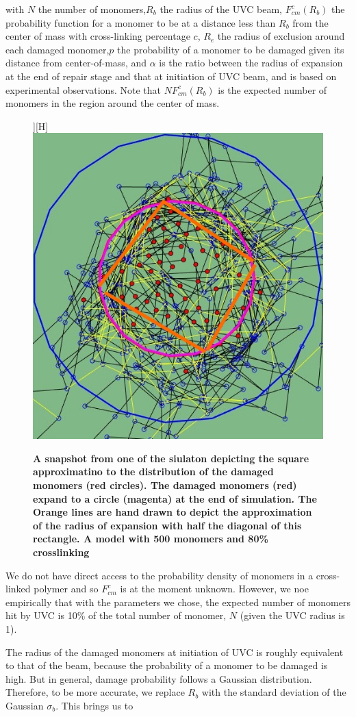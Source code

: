 \documentclass[12pt]{report}
\begin{document}
   with $N$ the number of monomers,$R_b$ the radius of the UVC beam, $F_{cm}^c(R_b)$ the probability function for a monomer to be at a distance less than $R_b$ from the center of mass with cross-linking percentage $c$, $R_e$ the radius of exclusion around each damaged monomer,$p$ the probability of a monomer to be damaged given its distance from center-of-mass, and $\alpha$ is the ratio between the radius of expansion at the end of repair stage and that at initiation of UVC beam, and is based on experimental observations. Note that $NF_{cm}^c(R_b)$ is the expected number of monomers in the region around the center of mass. 
   
	\begin{figure}][H]
	\centering
	\includegraphics[width=0.4\linewidth]{Images/ExludeAroundDamagedMonomers/BreakDamagedCrosslinks/testExpansion/snapshotForExampleOfExpansionEstimation}
	\caption{\tiny{\textbf{A snapshot from one of the siulaton depicting the square approximatino to the distribution of the damaged monomers (red circles). The damaged monomers (red) expand to a circle (magenta) at the end of simulation. The Orange lines are hand drawn to depict the approximation of the radius of expansion with half the diagonal of this rectangle. A model with 500 monomers and 80\% crosslinking}}}
	\label{fig:snapshotForExampleOfExpansionEstimation}
	\end{figure}
   We do not have direct access to the probability density of monomers in a cross-linked polymer and so $F_{cm}^c$ is at the moment unknown. However, we noe empirically that with the parameters we chose, the expected number of monomers hit by UVC is 10\% of the total number of monomer, $N$ (given the UVC radius is 1). 
   
   The radius of the damaged monomers at initiation of UVC is roughly equivalent to that of the beam, because the probability of a monomer to be damaged is high.  But in general, damage probability follows a Gaussian distribution. Therefore, to be more accurate, we replace $R_b$ with the standard deviation of the Gaussian $\sigma_{b}$. This brings us to 
    
\end{document}
